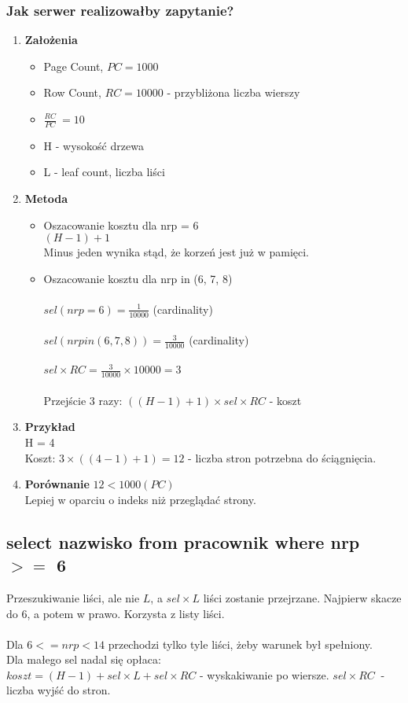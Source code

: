 \documentclass[a4paper,twoside]{article}
\begin{document}
  	\subsubsection*{Jak serwer realizowałby zapytanie?}
  	\begin{enumerate}
  		\item \textbf{Założenia}
  		\begin{itemize}
  			\item Page Count, \(PC = 1000\)
  			\item Row Count, \(RC = 10000\) - przybliżona liczba wierszy
  			\item \(\frac{RC}{PC} ~= 10\)
  			\item H - wysokość drzewa
  			\item L - leaf count, liczba liści
  		\end{itemize}
  		\item \textbf{Metoda}
  		\begin{itemize}
  			\item Oszacowanie kosztu dla nrp = 6\\
  			\((H - 1) + 1\)\\
  			Minus jeden wynika stąd, że korzeń jest już w pamięci.
  			\item 	Oszacowanie kosztu dla nrp in (6, 7, 8)\\\\
  			\(sel(nrp = 6) = \frac{1}{10000}\) (cardinality)\\\\
  			\(sel(nrp in (6,7,8)) = \frac{3}{10000}\) (cardinality)\\\\
  			\(sel\times{RC}=\frac{3}{10000}\times{10000}=3\)\\\\
  			Przejście 3 razy: \(((H-1)+1)\times{sel\times{RC}}\) - koszt
  		\end{itemize}
  		\item \textbf{Przykład}\\
  		H = 4\\
  		Koszt: \(3\times((4-1)+1) = 12\) - liczba stron potrzebna do ściągnięcia.
  		\item \textbf{Porównanie}
  		\(12 < 1000 (PC)\)\\
  		Lepiej w oparciu o indeks niż przeglądać strony.
  	\end{enumerate}
  	
  	
  	\subsection*{select nazwisko from pracownik where nrp \(>=\) 6} \noindent 
  	Przeszukiwanie liści, ale nie \(L\), a \(sel\times L\) liści zostanie przejrzane. Najpierw skacze do 6, a potem w prawo. Korzysta z listy liści.\\\\
  	Dla \(6 <= nrp < 14\) przechodzi tylko tyle liści, żeby warunek był spełniony.\\
  	Dla małego sel nadal się opłaca:\\
  	\(koszt = (H-1)+sel\times L + sel \times RC\) - wyskakiwanie po wiersze. $  sel \times RC\ $ - liczba wyjść do stron.
  	
\end{document}
